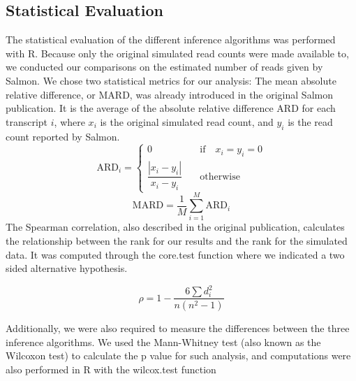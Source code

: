 \subsection{Statistical Evaluation}
The statistical evaluation of the different inference algorithms was performed with R. 
Because only the original simulated read counts were made available to, we conducted our comparisons on the estimated number of reads 
given by Salmon. We chose two statistical metrics for our analysis:
The mean absolute relative difference, or $\mathrm{MARD}$, 
was already introduced in the original Salmon publication. 
It is the average of the absolute relative difference $\mathrm{ARD}$ for each transcript $i$, 
where $x_i$ is the original simulated read count, and $y_i$ is the read count reported by Salmon.
\[
    \mathrm{ARD}_i = \begin{cases}
        0 &\quad\text{if}\quad x_i = y_i = 0\\
        \dfrac{\left| x_i-y_i \right| }{x_i-y_i} &\quad\text{otherwise}\quad
    \end{cases}
\]
\[
    \mathrm{MARD} = \frac{1}{M} \sum^{M}_{i = 1}\mathrm{ARD}_i
\]
The Spearman correlation, also described in the original publication, calculates the relationship between the rank for our results and the rank for the simulated data. It was computed through the core.test function where we indicated a two sided alternative hypothesis.

\[
    \rho = 1 - \dfrac{6 \sum{d^2_i}}{n(n^2-1)}
\]

Additionally, we were also required to measure the differences between the three inference algorithms. 
We used the Mann-Whitney test (also known as the Wilcoxon test) 
to calculate the p value for such analysis, and computations were also performed in R 
with the wilcox.test function
